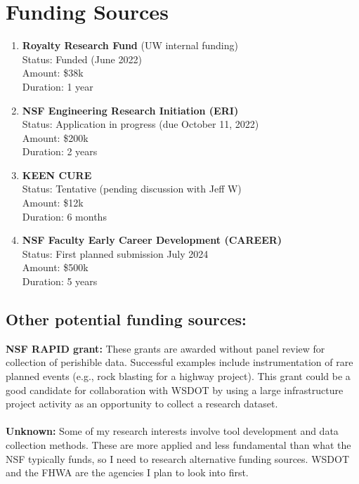 \documentclass[10pt,letterpaper]{article}
\begin{document}
\section{Funding Sources}
\begin{enumerate}
\item \textbf{Royalty Research Fund} (UW internal funding)\\ 
Status: Funded (June 2022)\\
Amount: \$38k\\
Duration: 1 year
\item \textbf{NSF Engineering Research Initiation (ERI)}\\
Status: Application in progress (due October 11, 2022)\\
Amount: \$200k\\
Duration: 2 years
\item \textbf{KEEN CURE}\\
Status: Tentative (pending discussion with Jeff W)\\
Amount: \$12k\\
Duration: 6 months
\item \textbf{NSF Faculty Early Career Development (CAREER)}\\
Status: First planned submission July 2024\\
Amount: \$500k\\
Duration: 5 years

\end{enumerate}
\subsection*{Other potential funding sources:}

\textbf{NSF RAPID grant:} These grants are awarded without panel review for collection of perishible data. Successful examples include instrumentation of rare planned events (e.g., rock blasting for a highway project). 
This grant could be a good candidate for collaboration with WSDOT by using a large infrastructure project activity as an opportunity to collect a research dataset.
\\
\\
\noindent \textbf{Unknown:} Some of my research interests involve tool development and data collection methods.
These are more applied and less fundamental than what the NSF typically funds, so I need to research alternative funding sources. 
WSDOT and the FHWA are the agencies I plan to look into first.
\end{document}

